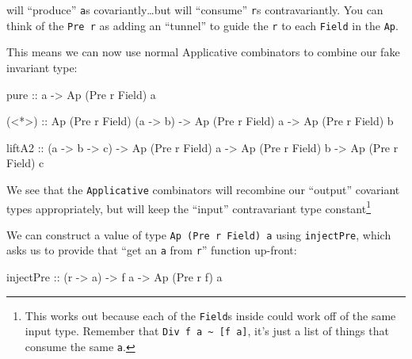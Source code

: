 \documentclass[]{article}
\newenvironment{Shaded}{}{}
\newcommand{\DataTypeTok}[1]{\textcolor[rgb]{0.56,0.13,0.00}{#1}}
\newcommand{\FunctionTok}[1]{\textcolor[rgb]{0.02,0.16,0.49}{#1}}
\newcommand{\NormalTok}[1]{#1}
\newcommand{\OperatorTok}[1]{\textcolor[rgb]{0.40,0.40,0.40}{#1}}
\newcommand{\OtherTok}[1]{\textcolor[rgb]{0.00,0.44,0.13}{#1}}
\begin{document}
will ``produce'' \texttt{a}s covariantly\ldots but will ``consume'' \texttt{r}s
contravariantly. You can think of the \texttt{Pre\ r} as adding an ``tunnel'' to
guide the \texttt{r} to each \texttt{Field} in the \texttt{Ap}.

This means we can now use normal Applicative combinators to combine our fake
invariant type:

\begin{Shaded}
\begin{Highlighting}[]
\FunctionTok{pure}\OtherTok{ ::}\NormalTok{ a }\OtherTok{{-}>} \DataTypeTok{Ap}\NormalTok{ (}\DataTypeTok{Pre}\NormalTok{ r }\DataTypeTok{Field}\NormalTok{) a}

\NormalTok{(}\OperatorTok{<*>}\NormalTok{)}
\OtherTok{    ::} \DataTypeTok{Ap}\NormalTok{ (}\DataTypeTok{Pre}\NormalTok{ r }\DataTypeTok{Field}\NormalTok{) (a }\OtherTok{{-}>}\NormalTok{ b)}
    \OtherTok{{-}>} \DataTypeTok{Ap}\NormalTok{ (}\DataTypeTok{Pre}\NormalTok{ r }\DataTypeTok{Field}\NormalTok{) a}
    \OtherTok{{-}>} \DataTypeTok{Ap}\NormalTok{ (}\DataTypeTok{Pre}\NormalTok{ r }\DataTypeTok{Field}\NormalTok{) b}

\NormalTok{liftA2}
\OtherTok{    ::}\NormalTok{ (a }\OtherTok{{-}>}\NormalTok{ b }\OtherTok{{-}>}\NormalTok{ c)}
    \OtherTok{{-}>} \DataTypeTok{Ap}\NormalTok{ (}\DataTypeTok{Pre}\NormalTok{ r }\DataTypeTok{Field}\NormalTok{) a}
    \OtherTok{{-}>} \DataTypeTok{Ap}\NormalTok{ (}\DataTypeTok{Pre}\NormalTok{ r }\DataTypeTok{Field}\NormalTok{) b}
    \OtherTok{{-}>} \DataTypeTok{Ap}\NormalTok{ (}\DataTypeTok{Pre}\NormalTok{ r }\DataTypeTok{Field}\NormalTok{) c}
\end{Highlighting}
\end{Shaded}

We see that the \texttt{Applicative} combinators will recombine our ``output''
covariant types appropriately, but will keep the ``input'' contravariant type
constant\footnote{This works out because each of the \texttt{Field}s inside
  could work off of the same input type. Remember that
  \texttt{Div\ f\ a\ \textasciitilde{}\ {[}f\ a{]}}, it's just a list of things
  that consume the same \texttt{a}.}

We can construct a value of type \texttt{Ap\ (Pre\ r\ Field)\ a} using
\texttt{injectPre}, which asks us to provide that ``get an \texttt{a} from
\texttt{r}'' function up-front:

\begin{Shaded}
\begin{Highlighting}[]
\OtherTok{injectPre ::}\NormalTok{ (r }\OtherTok{{-}>}\NormalTok{ a) }\OtherTok{{-}>}\NormalTok{ f a }\OtherTok{{-}>} \DataTypeTok{Ap}\NormalTok{ (}\DataTypeTok{Pre}\NormalTok{ r f) a}
\end{Highlighting}
\end{Shaded}
\end{document}

